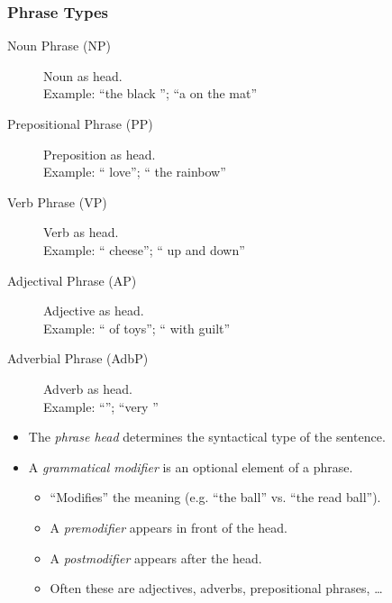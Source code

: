             \subsubsection{Phrase Types} %
            	\begin{description}
            		\item[Noun Phrase (NP)] Noun as head. \\ Example: \enquote{the black }; \enquote{a  on the mat}
            		\item[Prepositional Phrase (PP)] Preposition as head. \\ Example: \enquote{ love}; \enquote{ the rainbow}
            		\item[Verb Phrase (VP)] Verb as head. \\ Example: \enquote{ cheese}; \enquote{ up and down}
            		\item[Adjectival Phrase (AP)] Adjective as head. \\ Example: \enquote{ of toys}; \enquote{ with guilt}
            		\item[Adverbial Phrase (AdbP)] Adverb as head. \\ Example: \enquote{}; \enquote{very }
            	\end{description}
            	\begin{itemize}
            		\item The \textit{phrase head} determines the syntactical type of the sentence.
            		\item A \textit{grammatical modifier} is an optional element of a phrase.
            			\begin{itemize}
            				\item \enquote{Modifies} the meaning (e.g. \enquote{the ball} vs. \enquote{the read ball}).
            				\item A \textit{premodifier} appears in front of the head.
            				\item A \textit{postmodifier} appears after the head.
            				\item Often these are adjectives, adverbs, prepositional phrases, \dots
            			\end{itemize}
            	\end{itemize}

